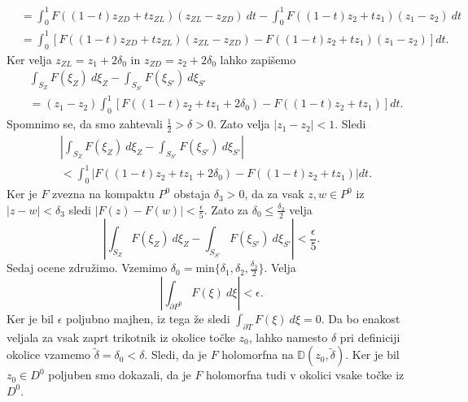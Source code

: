 \documentclass[mat1, tisk]{fmfdelo}
\begin{document}
\begin{dokaz}
\begin{align*}
            &=\int_{0}^{1}{F((1 -t)z_{ZD} + t z_{ZL})(z_{ZL} - z_{ZD})~dt} - \int_{0}^{1}{F((1 -t)z_{2} + t z_{1})(z_{1} - z_{2})~dt}\\
            &=\int_{0}^{1}{\left[F((1 -t)z_{ZD} + t z_{ZL})(z_{ZL} - z_{ZD}) - F((1 -t)z_{2} + t z_{1})(z_{1} - z_{2})\right]dt}.
        \end{align*}  
        Ker velja $z_{ZL} = z_{1} + 2 \delta_0$ in $z_{ZD} = z_2 + 2 \delta_0$ lahko zapišemo
        \begin{align*}
            &\int_{S_Z}{F(\xi_Z)~d\xi_Z} - \int_{S_{S'}}{F(\xi_{S'})~d\xi_{S'}}\\
            &=(z_{1} - z_{2})\int_{0}^{1}{\left[F((1 -t)z_{2} + t z_{1} + 2 \delta_0) - F((1 -t)z_{2} + t z_{1})\right]dt}.
        \end{align*}  
        Spomnimo se, da smo zahtevali $\frac{1}{2} > \delta > 0$. Zato velja $|z_1 - z_2|< 1$. Sledi
        \begin{align*}
            &\left|\int_{S_Z}{F(\xi_Z)~d\xi_Z} - \int_{S_{S'}}{F(\xi_{S'})~d\xi_{S'}}\right|\\
            &< \int_{0}^{1}{\left|F((1 -t)z_{2} + t z_{1} + 2 \delta_0) - F((1 -t)z_{2} + t z_{1})\right|dt}.
        \end{align*}  
        Ker je $F$ zvezna na kompaktu $P^0$ obstaja $\delta_3 >0$, da za vsak $z, w \in P^0$ iz $|z -w| < \delta_3$ sledi $|F(z) - F(w)| < \frac{\epsilon}{5}$.
        Zato za $\delta_0 \leq \frac{\delta_3}{2}$ velja
        \begin{equation*}
            \left|\int_{S_Z}{F(\xi_Z)~d\xi_Z} - \int_{S_{S'}}{F(\xi_{S'})~d\xi_{S'}}\right| < \frac{\epsilon}{5}.
        \end{equation*}  
        Sedaj ocene združimo. Vzemimo $\delta_0 = \text{min}\{\delta_1, \delta_2, \frac{\delta_3}{2}\}$. Velja
        $$ 
        \left|\int_{\partial P^0}{F(\xi)~d\xi}\right|< \epsilon.
        $$
        Ker je bil $\epsilon$ poljubno majhen, iz tega že sledi $\int_{\partial T}{F(\xi)~d\xi} = 0$. 
        Da bo enakost veljala za vsak zaprt trikotnik iz okolice točke $z_0$, lahko namesto $\delta$ pri definiciji okolice vzamemo $\widetilde{\delta} = \delta_0 < \delta$. 
        Sledi, da je $F$ holomorfna na $\mathbb{D}(z_0, \widetilde{\delta})$. Ker je bil $z_0 \in D^0$ poljuben smo dokazali, da je $F$ holomorfna tudi v okolici vsake točke iz $D^0$. 
    \end{dokaz}
\end{document}
